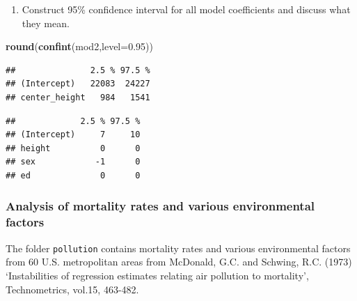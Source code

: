 \documentclass[]{article}
\newenvironment{Shaded}{\begin{snugshade}}{\end{snugshade}}
\newcommand{\KeywordTok}[1]{\textcolor[rgb]{0.13,0.29,0.53}{\textbf{#1}}}
\newcommand{\DataTypeTok}[1]{\textcolor[rgb]{0.13,0.29,0.53}{#1}}
\newcommand{\FloatTok}[1]{\textcolor[rgb]{0.00,0.00,0.81}{#1}}
\newcommand{\CommentTok}[1]{\textcolor[rgb]{0.56,0.35,0.01}{\textit{#1}}}
\newcommand{\NormalTok}[1]{#1}
\providecommand{\tightlist}{%
  \setlength{\itemsep}{0pt}\setlength{\parskip}{0pt}}
\begin{document}
\begin{enumerate}
\def\labelenumi{\arabic{enumi}.}
\setcounter{enumi}{4}
\tightlist
\item
  Construct 95\% confidence interval for all model coefficients and
  discuss what they mean.
\end{enumerate}

\begin{Shaded}
\begin{Highlighting}[]
\KeywordTok{round}\NormalTok{(}\KeywordTok{confint}\NormalTok{(mod2,}\DataTypeTok{level=}\FloatTok{0.95}\NormalTok{))}
\end{Highlighting}
\end{Shaded}

\begin{verbatim}
##               2.5 % 97.5 %
## (Intercept)   22083  24227
## center_height   984   1541
\end{verbatim}

\begin{Shaded}
\end{Shaded}

\begin{verbatim}
##             2.5 % 97.5 %
## (Intercept)     7     10
## height          0      0
## sex            -1      0
## ed              0      0
\end{verbatim}

\begin{Shaded}
\end{Shaded}

\subsubsection{Analysis of mortality rates and various environmental
factors}\label{analysis-of-mortality-rates-and-various-environmental-factors}

The folder \texttt{pollution} contains mortality rates and various
environmental factors from 60 U.S. metropolitan areas from McDonald,
G.C. and Schwing, R.C. (1973) `Instabilities of regression estimates
relating air pollution to mortality', Technometrics, vol.15, 463-482.
\end{document}
